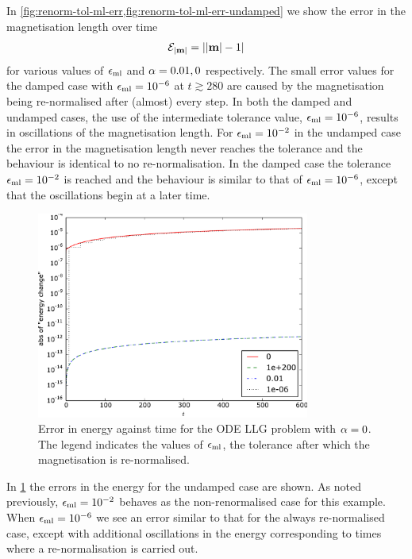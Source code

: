 In \cref{fig:renorm-tol-ml-err,fig:renorm-tol-ml-err-undamped} we show the error in the magnetisation length over time
\begin{equation}
  \mathcal{E}_{\left|{\boldsymbol{\mathrm{m}}} \right|} = \left|{\left|{\boldsymbol{\mathrm{m}}} \right| - 1} \right|
\end{equation}
for various values of $\epsilon_{\mathrm{ml}}$ and $\alpha=0.01, 0$ respectively.
The small error values for the damped case with $\epsilon_{\mathrm{ml}} = 10^{-6}$ at $t \gtrsim 280$ are caused by the magnetisation being re-normalised after (almost) every step.
In both the damped and undamped cases, the use of the intermediate tolerance value, $\epsilon_{\mathrm{ml}} = 10^{-6}$, results in oscillations of the magnetisation length.
For $\epsilon_{\mathrm{ml}} = 10^{-2}$ in the undamped case the error in the magnetisation length never reaches the tolerance and the behaviour is identical to no re-normalisation.
In the damped case the tolerance $\epsilon_{\mathrm{ml}} = 10^{-2}$ is reached and the behaviour is similar to that of $\epsilon_{\mathrm{ml}} = 10^{-6}$, except that the oscillations begin at a later time.


\begin{figure}
  \centering
  \includegraphics[width=0.8\textwidth]{plots/tolrenorm-geom-properties/0-absofenergychangevstimes.pdf}
  \caption{
    Error in energy against time
    for the ODE LLG problem
    with $\alpha = 0$.
    The legend indicates the values of $\epsilon_{\mathrm{ml}}$, the tolerance after which the magnetisation is re-normalised.
  }
  \label{fig:renorm-tol-energy-err}
\end{figure}

In \cref{fig:renorm-tol-energy-err} the errors in the energy for the undamped case are shown.
As noted previously, $\epsilon_{\mathrm{ml}}= 10^{-2}$ behaves as the non-renormalised case for this example.
When $\epsilon_{\mathrm{ml}} = 10^{-6}$ we see an error similar to that for the always re-normalised case, except with additional oscillations in the energy corresponding to times where a re-normalisation is carried out.


